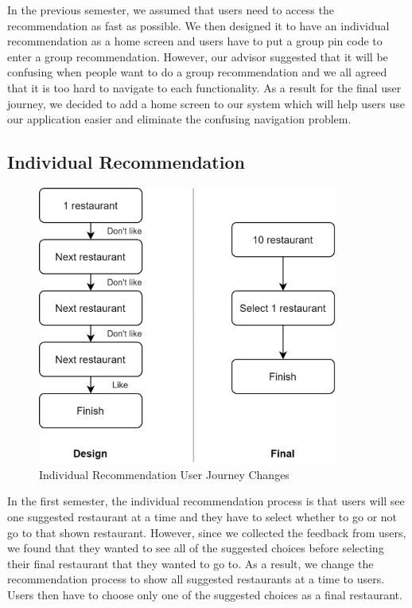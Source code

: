 \documentclass[12pt,oneside,openright,a4paper]{cpe-english-project}
\begin{document}
In the previous semester, we assumed that users need to access the recommendation as fast as possible. We then designed it to have an individual recommendation as a home screen and users have to put a group pin code to enter a group recommendation. However, our advisor suggested that it will be confusing when people want to do a group recommendation and we all agreed that it is too hard to navigate to each functionality. As a result for the final user journey, we decided to add a home screen to our system which will help users use our application easier and eliminate the confusing navigation problem.

\subsection{Individual Recommendation}

\begin{figure}[H]\centering
\includegraphics[width=280pt]{./images/4IndividualRecommendationUserJourneyChanges.png}
\caption{Individual Recommendation User Journey Changes}\label{fig:4IndividualRecommendationUserJourneyChanges}
\end{figure}

In the first semester, the individual recommendation process is that users will see one suggested restaurant at a time and they have to select whether to go or not go to that shown restaurant. However, since we collected the feedback from users, we found that they wanted to see all of the suggested choices before selecting their final restaurant that they wanted to go to. As a result, we change the recommendation process to show all suggested restaurants at a time to users. Users then have to choose only one of the suggested choices as a final restaurant.
\end{document}

